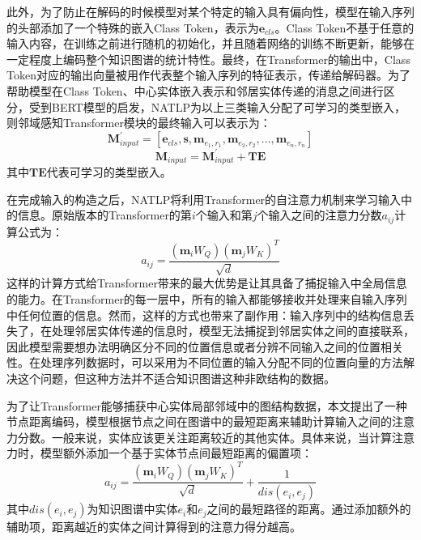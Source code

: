 此外，为了防止在解码的时候模型对某个特定的输入具有偏向性，模型在输入序列的头部添加了一个特殊的嵌入Class Token，表示为$\boldsymbol{e}_{cls}$。Class Token不基于任意的输入内容，在训练之前进行随机的初始化，并且随着网络的训练不断更新，能够在一定程度上编码整个知识图谱的统计特性。最终，在Transformer的输出中，Class Token对应的输出向量被用作代表整个输入序列的特征表示，传递给解码器。为了帮助模型在Class Token、中心实体嵌入表示和邻居实体传递的消息之间进行区分，受到BERT模型的启发，NATLP为以上三类输入分配了可学习的类型嵌入，则邻域感知Transformer模块的最终输入可以表示为：
\begin{equation}
  \mathbf{M}_{input}^\prime = \left[\boldsymbol{e}_{cls},\boldsymbol{s},\boldsymbol{m}_{e_1,r_1},\boldsymbol{m}_{e_2,r_2},...,\boldsymbol{m}_{e_n,r_n}\right]
\end{equation}
\begin{equation}
  \mathbf{M}_{input} = \mathbf{M}_{input}^\prime + \mathbf{TE}
\end{equation}
其中$\mathbf{TE}$代表可学习的类型嵌入。

在完成输入的构造之后，NATLP将利用Transformer的自注意力机制来学习输入中的信息。原始版本的Transformer的第$i$个输入和第$j$个输入之间的注意力分数$a_{ij}$计算公式为：
\begin{equation}
  \label{attention_score}
  a_{ij}=\frac{(\boldsymbol{m}_iW_Q)(\boldsymbol{m}_jW_K)^T}{\sqrt{d}}
\end{equation}
这样的计算方式给Transformer带来的最大优势是让其具备了捕捉输入中全局信息的能力。在Transformer的每一层中，所有的输入都能够接收并处理来自输入序列中任何位置的信息。然而，这样的方式也带来了副作用：输入序列中的结构信息丢失了，在处理邻居实体传递的信息时，模型无法捕捉到邻居实体之间的直接联系，因此模型需要想办法明确区分不同的位置信息或者分辨不同输入之间的位置相关性。在处理序列数据时，可以采用为不同位置的输入分配不同的位置向量的方法解决这个问题，但这种方法并不适合知识图谱这种非欧结构的数据。

为了让Transformer能够捕获中心实体局部邻域中的图结构数据，本文提出了一种节点距离编码，模型根据节点之间在图谱中的最短距离来辅助计算输入之间的注意力分数。一般来说，实体应该更关注距离较近的其他实体。具体来说，当计算注意力时，模型额外添加一个基于实体节点间最短距离的偏置项：
\begin{equation}
  a_{ij}=\frac{(\boldsymbol{m}_iW_Q)(\boldsymbol{m}_jW_K)^T}{\sqrt{d}}+\frac{1}{dis(e_i,e_j)}
\end{equation}
其中$dis(e_i,e_j)$为知识图谱中实体$e_i$和$e_j$之间的最短路径的距离。通过添加额外的辅助项，距离越近的实体之间计算得到的注意力得分越高。

